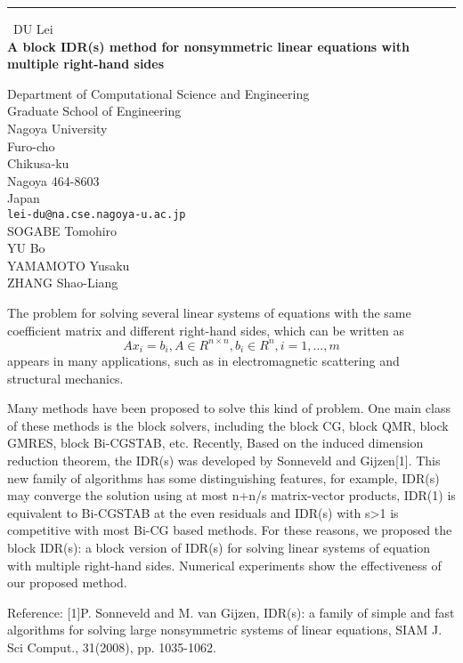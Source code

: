 \documentclass{report}
\begin{document}
\begin{center}
\rule{6in}{1pt} \
{\large DU Lei \\
{\bf A block IDR(s) method for nonsymmetric linear equations with multiple right-hand sides}}

Department of Computational Science and Engineering \\ Graduate School of Engineering \\ Nagoya University \\ Furo-cho \\ Chikusa-ku \\ Nagoya 464-8603 \\ Japan
\\
{\tt lei-du@na.cse.nagoya-u.ac.jp}\\
SOGABE Tomohiro\\
YU Bo\\
YAMAMOTO Yusaku\\
ZHANG Shao-Liang\end{center}

The problem for solving several linear systems of equations with the same
coefficient matrix and different right-hand sides, which can be written
as
\begin{equation}
Ax_i=b_i, A\in R^{n\times n}, b_i\in R^n, i=1,...,m
\end{equation}
appears in many applications, such as in electromagnetic scattering and
structural mechanics.

Many methods have been proposed to solve this kind of problem. One main
class of these methods is the block solvers, including the block CG,
block QMR, block GMRES, block Bi-CGSTAB, etc.
Recently, Based on the induced dimension reduction theorem, the IDR(s)
was developed by Sonneveld and Gijzen[1]. This new family of algorithms
has some distinguishing features, for example, IDR(s) may converge the
solution using at most n+n/s matrix-vector products, IDR(1) is equivalent
to Bi-CGSTAB at the even residuals and IDR(s) with s>1 is competitive
with most Bi-CG based methods. For these reasons, we proposed the block
IDR(s): a block version of IDR(s) for solving linear systems of equation
with multiple right-hand sides. Numerical experiments show the
effectiveness of our proposed method.

Reference:
[1]P. Sonneveld and M. van Gijzen, IDR(s): a family of simple and fast
algorithms for solving large nonsymmetric systems of linear equations,
SIAM J. Sci Comput., 31(2008), pp. 1035-1062.
\end{document}

